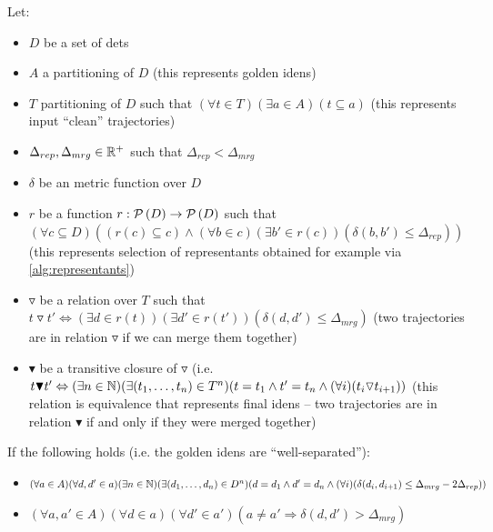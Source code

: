 \begin{claim}
\label{clm:claim}
Let:

\setlength{\itemsep}{0pt}
\setlength{\parskip}{0pt}

\begin{itemize}
    \item $D$ be a set of \glspl{det}
    \item $A$ a partitioning of $D$ (this represents golden \glspl{iden})
    \item $T$ partitioning of $D$ such that $(\forall t \in T) (\exists a \in A) (t \subseteq a)$ (this represents input ``clean'' trajectories)
    \item $\Delta_{rep}, \Delta_{mrg} \in \mathbb{R}^+$ such that $\Delta_{rep} < \Delta_{mrg}$
    \item $\delta$ be an metric function over $D$
    \item $r$ be a function $r: \mathcal{P}\left(D\right) \rightarrow \mathcal{P}\left(D\right)$ such that $(\forall c \subseteq D)((r(c) \subseteq c) \land (\forall b \in c) (\exists b' \in r(c)) (\delta(b, b') \leq \Delta_{rep}))$ (this represents selection of representants obtained for example via \autoref{alg:representants})
    \item $\triangledown$ be a relation over $T$ such that $t\triangledown t' \Leftrightarrow (\exists d \in r(t)) (\exists d' \in r(t')) (\delta(d, d') \leq \Delta_{mrg})$ (two trajectories are in relation $\triangledown$ if we can merge them together)
    \item $\blacktriangledown$ be a transitive closure of $\triangledown$ (i.e. $t \blacktriangledown t' \Leftrightarrow (\exists n \in \mathbb{N}) (\exists (t_1, \ldots, t_n) \in T^n) (t = t_1 \land t' = t_n \land (\forall i) (t_i\triangledown t_{i+1}))$ (this relation is equivalence that represents final \glspl{iden} -- two trajectories are in relation $\blacktriangledown$ if and only if they were merged together)
\end{itemize}

If the following holds (i.e. the golden \glspl{iden} are ``well-separated''):
\begin{itemize}
    \item $(\forall a \in A)(\forall d, d' \in a) (\exists n \in \mathbb{N}) (\exists (d_1, \ldots, d_n) \in D^n) (d = d_1 \land d' = d_n \land (\forall i) (\delta(d_i, d_{i+1}) \leq \Delta_{mrg} - 2\Delta_{rep}))$
    \item $(\forall a, a' \in A) (\forall d \in a) (\forall d' \in a') (a \neq a' \Rightarrow \delta(d, d') > \Delta_{mrg})$
\end{itemize}


\end{claim}
